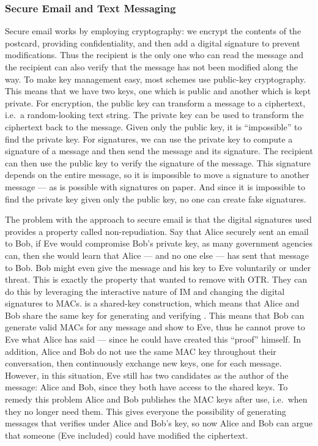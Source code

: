 \subsubsection{Secure Email and Text Messaging}

Secure email works by employing cryptography: we encrypt the contents of the 
postcard, providing confidentiality, and then add a digital signature to 
prevent modifications.
Thus the recipient is the only one who can read the message and the recipient 
can also verify that the message has not been modified along the way.
To make key management easy, most schemes use public-key cryptography.
This means that we have two keys, one which is public and another which is kept
private.
For encryption, the public key can transform a message to a ciphertext, i.e.\ 
a random-looking text string.
The private key can be used to transform the ciphertext back to the message.
Given only the public key, it is \enquote{impossible} to find the private key.
For signatures, we can use the private key to compute a signature of a message 
and then send the message and its signature.
The recipient can then use the public key to verify the signature of the 
message.
This signature depends on the entire message, so it is impossible to move 
a signature to another message --- as is possible with signatures on paper.
And since it is impossible to find the private key given only the public key, 
no one can create fake signatures.

The problem with the approach to secure email is that the digital signatures 
used provides a property called non-repudiation.
Say that Alice securely sent an email to Bob, if Eve would compromise Bob's 
private key, as many government agencies can, then she would learn that Alice 
--- and no one else --- has sent that message to Bob.
Bob might even give the message and his key to Eve voluntarily or under threat.
This is exactly the property that \citeauthor{otr2004} wanted to remove with 
\ac{OTR}.
They can do this by leveraging the interactive nature of \ac{IM} and changing 
the digital signatures to \acp{MAC}.
 is a shared-key construction, which means that Alice and Bob share 
the same key for generating and verifying \iac{MAC}.
This means that Bob can generate valid \acp{MAC} for any message and show to 
Eve, thus he cannot prove to Eve what Alice has said --- since he could have 
created this \enquote{proof} himself.
In addition, Alice and Bob do not use the same \ac{MAC} key throughout their 
conversation, then continuously exchange new keys, one for each message.
However, in this situation, Eve still has two candidates as the author of the 
message: Alice and Bob, since they both have access to the shared keys.
To remedy this problem Alice and Bob publishes the \ac{MAC} keys after use, 
i.e.\ when they no longer need them.
This gives everyone the possibility of generating messages that verifies under 
Alice and Bob's key, so now Alice and Bob can argue that someone (Eve included) 
could have modified the ciphertext.

